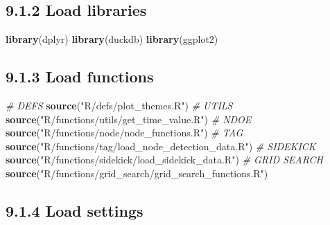 \documentclass[
]{book}
\newenvironment{Shaded}{\begin{snugshade}}{\end{snugshade}}
\newcommand{\CommentTok}[1]{\textcolor[rgb]{0.56,0.35,0.01}{\textit{#1}}}
\newcommand{\FunctionTok}[1]{\textcolor[rgb]{0.13,0.29,0.53}{\textbf{#1}}}
\newcommand{\NormalTok}[1]{#1}
\newcommand{\StringTok}[1]{\textcolor[rgb]{0.31,0.60,0.02}{#1}}
\begin{document}
\subsection{9.1.2 Load libraries}\label{load-libraries-1}

\begin{Shaded}
\begin{Highlighting}[]
\FunctionTok{library}\NormalTok{(dplyr)}
\FunctionTok{library}\NormalTok{(duckdb)}
\FunctionTok{library}\NormalTok{(ggplot2)}
\end{Highlighting}
\end{Shaded}

\subsection{9.1.3 Load functions}\label{load-functions-2}

\begin{Shaded}
\begin{Highlighting}[]
\CommentTok{\# DEFS}
\FunctionTok{source}\NormalTok{(}\StringTok{"R/defs/plot\_themes.R"}\NormalTok{)}
\CommentTok{\# UTILS}
\FunctionTok{source}\NormalTok{(}\StringTok{"R/functions/utils/get\_time\_value.R"}\NormalTok{)}
\CommentTok{\# NDOE}
\FunctionTok{source}\NormalTok{(}\StringTok{"R/functions/node/node\_functions.R"}\NormalTok{)}
\CommentTok{\# TAG}
\FunctionTok{source}\NormalTok{(}\StringTok{"R/functions/tag/load\_node\_detection\_data.R"}\NormalTok{)}
\CommentTok{\# SIDEKICK}
\FunctionTok{source}\NormalTok{(}\StringTok{"R/functions/sidekick/load\_sidekick\_data.R"}\NormalTok{)}
\CommentTok{\# GRID SEARCH}
\FunctionTok{source}\NormalTok{(}\StringTok{"R/functions/grid\_search/grid\_search\_functions.R"}\NormalTok{)}
\end{Highlighting}
\end{Shaded}

\subsection{9.1.4 Load settings}\label{load-settings-3}
\end{document}
